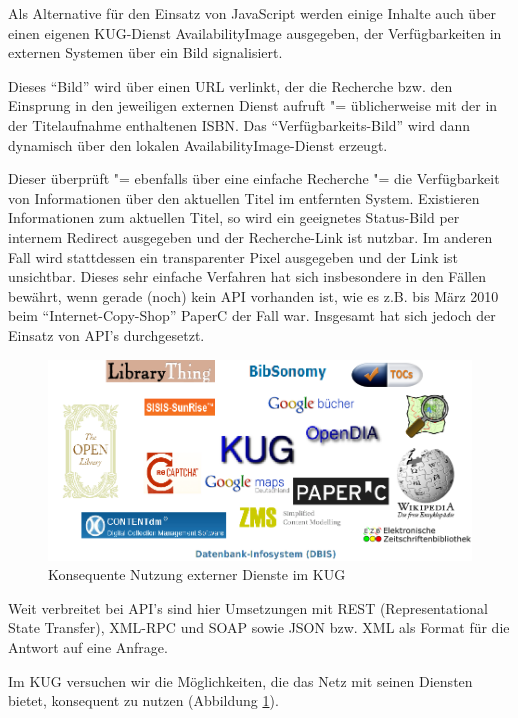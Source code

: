\documentclass[11pt]{scrartcl}
\begin{document}
Als Alternative für den Einsatz von JavaScript werden einige Inhalte
auch über einen eigenen KUG-Dienst AvailabilityImage ausgegeben, der
Verfügbarkeiten in externen Systemen über ein Bild signalisiert.

Dieses "`Bild"' wird über einen URL verlinkt, der die Recherche bzw.
den Einsprung in den jeweiligen externen Dienst aufruft "=
üblicherweise mit der in der Titelaufnahme enthaltenen ISBN. Das
"`Verfügbarkeits-Bild"' wird dann dynamisch über den lokalen
AvailabilityImage-Dienst erzeugt.

Dieser überprüft "= ebenfalls über eine einfache Recherche "= die
Verfügbarkeit von Informationen über den aktuellen Titel im entfernten
System. Existieren Informationen zum aktuellen Titel, so wird ein
geeignetes Status-Bild per internem Redirect ausgegeben und der
Recherche-Link ist nutzbar.  Im anderen Fall wird stattdessen ein
transparenter Pixel ausgegeben und der Link ist unsichtbar. Dieses
sehr einfache Verfahren hat sich insbesondere in den Fällen bewährt,
wenn gerade (noch) kein API vorhanden ist, wie es z.B. bis März 2010
beim "`Internet-Copy-Shop"' PaperC der Fall war. Insgesamt hat sich
jedoch der Einsatz von API's durchgesetzt.

\begin{figure}
    \centering \begin{minipage}[b]{1.0\textwidth}
      \centering \includegraphics[width=15cm]{bib20-kug-mashups_bilder/mashups.png}
    \end{minipage}
    \caption{Konsequente Nutzung externer Dienste im KUG}
  \label{bild:mashups}
\end{figure}

Weit verbreitet bei API's sind hier Umsetzungen mit REST
(Representational State Transfer), XML-RPC und SOAP sowie JSON bzw.
XML als Format für die Antwort auf eine Anfrage.

Im KUG versuchen wir die Möglichkeiten, die das Netz mit seinen
Diensten bietet, konsequent zu nutzen (Abbildung \ref{bild:mashups}).
\end{document}
